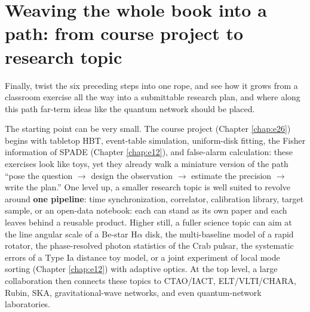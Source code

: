 \section{Weaving the whole book into a path: from course project to research topic}
\label{sec:e28-path}

Finally, twist the six preceding steps into one rope, and see how it grows from a classroom exercise all the way into a submittable research plan, and where along this path far-term ideas like the quantum network should be placed.

The starting point can be very small. The course project (Chapter \ref{chap:e26}) begins with tabletop HBT, event-table simulation, uniform-disk fitting, the Fisher information of SPADE (Chapter \ref{chap:e12}), and false-alarm calculation: these exercises look like toys, yet they already walk a miniature version of the path ``pose the question \(\to\) design the observation \(\to\) estimate the precision \(\to\) write the plan.'' One level up, a smaller research topic is well suited to revolve around \textbf{one pipeline}: time synchronization, correlator, calibration library, target sample, or an open-data notebook: each can stand as its own paper and each leaves behind a reusable product. Higher still, a fuller science topic can aim at the line angular scale of a Be-star \(\mathrm{H}\alpha\) disk, the multi-baseline model of a rapid rotator, the phase-resolved photon statistics of the Crab pulsar, the systematic errors of a Type Ia distance toy model, or a joint experiment of local mode sorting (Chapter \ref{chap:e12}) with adaptive optics. At the top level, a large collaboration then connects these topics to CTAO/IACT, ELT/VLTI/CHARA, Rubin, SKA, gravitational-wave networks, and even quantum-network laboratories.

